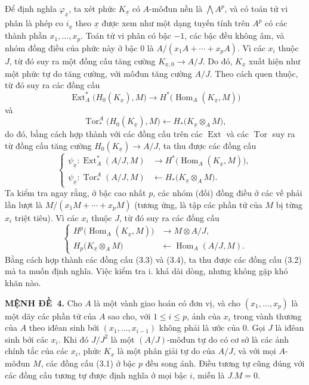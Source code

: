 \documentclass[11pt,twoside,openany]{book}
\numberwithin{equation}{section}
\newcommand{\src}[1]{%
  \phantomsection\hypertarget{src:\fgasourceid:#1}{}%
  \marginpar{\raggedleft\footnotesize\sffamily #1}%
}
\newcommand{\fgasourceid}{unset}
\newcommand{\result}[2]{\par\medskip\noindent\textbf{#1\if\relax\detokenize{#2}\relax\else\ #2\fi.}\quad}
\begin{document}
Để định nghĩa $\varphi_{\underline{x}}$, ta xét phức
$K_{\underline{x}}$ có $A$-môđun nền là $\bigwedge A^{p}$, và
có toán tử vi phân là phép co $i_{\underline{x}}$ theo
$\underline{x}$ được xem như một dạng tuyến tính trên $A^{p}$ có các thành phần
$x_1,\ldots,x_p$. Toán tử vi phân có bậc $-1$, các bậc đều
không âm, và nhóm đồng điều của phức này ở bậc $0$ là
$A/(x_1A+\cdots+x_pA)$. Vì các $x_i$ thuộc $J$, từ đó suy ra một
đồng cấu tăng cường $K_{\underline{x},0}\longrightarrow A/J$. Do đó,
$K_{\underline{x}}$ xuất hiện như một phức tự do tăng cường, với môđun
tăng cường $A/J$. Theo cách quen thuộc, từ đó suy ra các đồng cấu
\[
\operatorname{Ext}_{A}^{*}\bigl(H_0(K_{\underline{x}}),M\bigr)
\longrightarrow
H^{*}\bigl(\operatorname{Hom}_{A}(K_{\underline{x}},M)\bigr)
\]
và
\[
\operatorname{Tor}_{*}^{A}\bigl(H_0(K_{\underline{x}}),M\bigr)
\longleftarrow
H_{*}\bigl(K_{\underline{x}}\otimes_A M\bigr),
\]
do đó, bằng cách hợp thành với các đồng cấu trên các $\operatorname{Ext}$ và các
$\operatorname{Tor}$ suy ra từ đồng cấu tăng cường
$H_0(K_{\underline{x}})\longrightarrow A/J$, ta thu được các đồng cấu
\begin{equation}\tag{3.3}
\left\{
\begin{aligned}
\psi_{\underline{x}}:
\operatorname{Ext}_{A}^{*}(A/J,M)
&\longrightarrow H^{*}\bigl(\operatorname{Hom}_{A}(K_{\underline{x}},M)\bigr),\\
\psi_{\underline{x}}:
\operatorname{Tor}_{*}^{A}(A/J,M)
&\longleftarrow H_{*}\bigl(K_{\underline{x}}\otimes_A M\bigr).
\end{aligned}
\right.
\end{equation}
Ta kiểm tra ngay rằng, ở bậc cao nhất $p$, các nhóm (đối) đồng điều ở các vế
phải lần lượt là $M/(x_1M+\cdots+x_pM)$ (tương ứng, là tập các phần tử của $M$
bị từng $x_i$ triệt tiêu). Vì các $x_i$ thuộc $J$, từ đó suy ra các
đồng cấu
\begin{equation}\tag{3.4}
\left\{
\begin{aligned}
H^{p}\bigl(\operatorname{Hom}_{A}(K_{\underline{x}},M)\bigr)
&\longrightarrow M\otimes A/J,\\
H_{p}\bigl(K_{\underline{x}}\otimes_A M\bigr)
&\longleftarrow\operatorname{Hom}_{A}(A/J,M).
\end{aligned}
\right.
\end{equation}
Bằng cách hợp thành các đồng cấu (3.3) và (3.4), ta thu được các đồng cấu (3.2)
mà ta muốn định nghĩa. Việc kiểm tra i. khá dài dòng, nhưng không
gặp khó khăn nào.

\src{175}
\result{MỆNH ĐỀ}{4} Cho $A$ là một vành giao hoán có đơn vị, và cho
$(x_1,\ldots,x_p)$ là một dãy các phần tử của $A$ sao cho, với $1\leq i\leq p$,
ảnh của $x_i$ trong vành thương của $A$ theo iđêan sinh bởi
$(x_1,\ldots,x_{i-1})$ không phải là ước của $0$. Gọi $J$ là iđêan sinh
bởi các $x_i$. Khi đó $J/J^{2}$ là một $(A/J)$-môđun tự do có cơ sở là các
ảnh chính tắc của các $x_i$, phức $K_{\underline{x}}$ là một
phân giải tự do của $A/J$, và với mọi $A$-môđun $M$, các đồng cấu (3.1) ở
bậc $p$ đều song ánh. Điều tương tự cũng đúng với các đồng cấu tương tự
được định nghĩa ở mọi bậc $i$, miễn là $J.M=0$.
\end{document}
